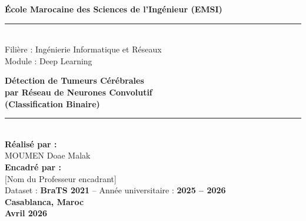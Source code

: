 \documentclass[12pt, a4paper]{report}
\begin{document}
\begin{titlepage}
  \centering


  {\Large\bfseries\color{emsiBlue}
    École Marocaine des Sciences de l'Ingénieur (EMSI)\\[0.4em]}
  \rule{\linewidth}{0.6pt}\\[0.8em]
  {\large Filière : Ingénierie Informatique et Réseaux\\
   Module : Deep Learning}\\[3em]


  {\fontsize{22}{26}\selectfont\bfseries\color{emsiBlue}
    Détection de Tumeurs Cérébrales\\[0.3em]
    par Réseau de Neurones Convolutif\\[0.3em]
    (Classification Binaire)}\\[1.5em]

  \rule{\linewidth}{0.6pt}\\[2.5em]

  {\large\bfseries Réalisé par :}\\[0.6em]
  {\Large MOUMEN Doae Malak}\\[2em]

  {\large\bfseries Encadré par :}\\[0.6em]
  {\large [Nom du Professeur encadrant]}\\[2.5em]

  {\large Dataset : \textbf{BraTS 2021} \quad--\quad
   Année universitaire : \textbf{2025 -- 2026}}\\[3em]

  \vfill
  {\large\bfseries\color{emsiBlue} Casablanca, Maroc\\ Avril 2026}

\end{titlepage}

\end{document}

